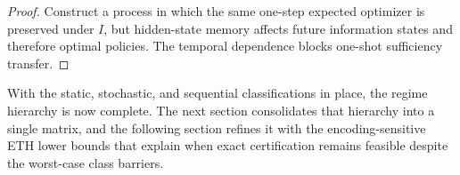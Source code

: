 \begin{proof}
Construct a process in which the same one-step expected optimizer is preserved under $I$, but hidden-state memory affects future information states and therefore optimal policies. The temporal dependence blocks one-shot sufficiency transfer.
\end{proof}

With the static, stochastic, and sequential classifications in place, the regime
hierarchy is now complete. The next section consolidates that hierarchy into a
single matrix, and the following section refines it with the encoding-sensitive
ETH lower bounds that explain when exact certification remains feasible despite
the worst-case class barriers.
